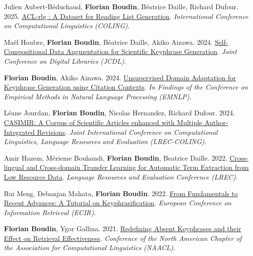 \item 
Julien Aubert-Béduchaud, \textbf{Florian Boudin}, Béatrice Daille, Richard Dufour.
2025.
\href{https://hal.science/hal-04852617v1/file/main.pdf}{ACL-rlg : A Dataset for Reading List Generation}.
\textit{International Conference on Computational Linguistics (COLING)}.
\label{aubert-beduchaud-etal-2025-acl}

\item 
Maël Houbre, \textbf{Florian Boudin}, Béatrice Daille, Akiko Aizawa.
2024.
\href{https://arxiv.org/pdf/2411.03039}{Self-Compositional Data Augmentation for Scientific Keyphrase Generation}.
\textit{Joint Conference on Digital Libraries (JCDL)}.
\label{houbre-etal-2024-self}

\item
\textbf{Florian Boudin}, Akiko Aizawa.
2024.
\href{https://aclanthology.org/2024.findings-emnlp.33.pdf}{Unsupervised Domain Adaptation for Keyphrase Generation using Citation Contexts}.
\textit{In Findings of the Conference on Empirical Methods in Natural Language Processing (EMNLP)}.
\label{boudin-aizawa-2024-unsupervised}

\item 
Léane Jourdan, \textbf{Florian Boudin}, Nicolas Hernandez, Richard Dufour.
2024.
\href{https://aclanthology.org/2024.lrec-main.257.pdf}{CASIMIR: A Corpus of Scientific Articles enhanced with Multiple Author-Integrated Revisions}.
\textit{Joint International Conference on Computational Linguistics, Language Resources and Evaluation (LREC-COLING)}.
\label{jourdan-etal-2024-casimir}

\item
Amir Hazem, Mérieme Bouhandi, \textbf{Florian Boudin}, Beatrice Daille.
2022.
\href{https://aclanthology.org/2022.lrec-1.68.pdf}{Cross-lingual and Cross-domain Transfer Learning for Automatic Term Extraction from Low Resource Data}.
\textit{Language Resources and Evaluation Conference (LREC)}.
\label{hazem-etal-2022-cross}

\item
Rui Meng, Debanjan Mahata, \textbf{Florian Boudin}.
2022.
\href{https://link.springer.com/chapter/10.1007/978-3-030-99739-7_73}{From Fundamentals to Recent Advances: A Tutorial on Keyphrasification}.
\textit{European Conference on Information Retrieval (ECIR)}.
\label{meng-etal-2022-fundamentals}

\item 
\textbf{Florian Boudin}, Ygor Gallina.
2021.
\href{https://www.aclweb.org/anthology/2021.naacl-main.330.pdf}{Redefining Absent Keyphrases and their Effect on Retrieval Effectiveness}.
\textit{Conference of the North American Chapter of the Association for Computational Linguistics (NAACL)}.
\label{boudin-gallina-2021-redefining}

